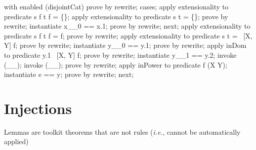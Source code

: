 \begin{LPScript}\begin{forget}[lPFunDomPartitionsPFunDRes]
    with enabled (disjointCat) prove by rewrite;
    cases;
        apply extensionality to predicate s \dres [X, Y] f \cap [X \cross  Y] t \dres [X, Y] f = \{\};
        apply extensionality to predicate s \cap [X] t = \{\};
        prove by rewrite;
        instantiate x\_\_0 == x.1;
        prove by rewrite;
    next;
        apply extensionality to predicate s \dres [X, Y] f \cup [X \cross  Y] t \dres [X, Y] f = f;
        prove by rewrite;
        apply extensionality to predicate s \cup [X] t = \dom~[X, Y] f;
        prove by rewrite;
        instantiate y\_\_0 == y.1;
        prove by rewrite;
        apply inDom to predicate y.1 \in  \dom~[X, Y] f;
        prove by rewrite;
        instantiate y\_\_1 == y.2;
        invoke (\_\pfun \_);
        invoke (\_\rel \_);
        prove by rewrite;
        apply inPower to predicate f \in  \power  (X \cross  Y);
        instantiate e == y;
        prove by rewrite;
    next;
\end{forget}\end{LPScript} \section{Injections}

Lemmas are toolkit theorems that are not rules (\textit{i.e.,} cannot be automatically applied)



